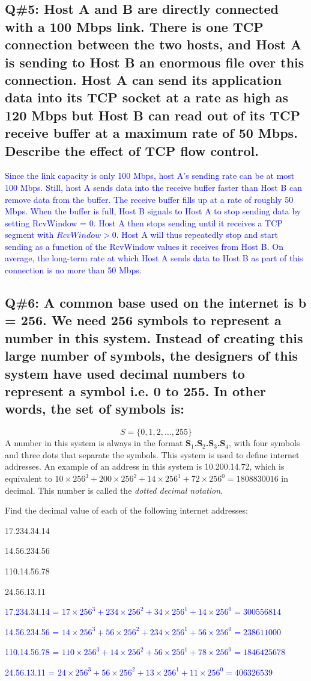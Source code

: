 \subsection*{Q\#5: Host A and B are directly connected with a 100 Mbps link. There is one TCP connection between the two hosts, and Host A is sending to Host B an enormous file over this connection. Host A can send its application data into its TCP socket at a rate as high as 120 Mbps but Host B can read out of its TCP receive buffer at a maximum rate of 50 Mbps. Describe the effect of TCP flow control.}
\textcolor{blue}{
Since the link capacity is only 100 Mbps, host A’s sending rate can be at most 100 Mbps. Still, host A sends data into the receive buffer faster than Host B can remove data from the buffer. The receive buffer fills up at a rate of roughly 50 Mbps. When the buffer is full, Host B signals to Host A to stop sending data by setting RcvWindow = 0. Host A then stops sending until it receives a TCP segment with \(RcvWindow > 0\).
Host A will thus repeatedly stop and start sending as a function of the RcvWindow values it receives from Host B. On average, the long-term rate at which Host A sends data to Host B as part of this connection is no more than 50 Mbps.
}
\subsection*{Q\#6: A common base used on the internet is b = 256. We need 256 symbols to represent a number in this system. Instead of creating this large number of symbols, the designers of this system have used decimal numbers to represent a symbol i.e. 0 to 255. In other words, the set of symbols is:}
\[ S = \{0, 1, 2, \ldots, 255\} \]
A number in this system is always in the format \textbf{S$_1$.S$_2$.S$_3$.S$_4$}, with four symbols and three dots that separate the symbols. This system is used to define internet addresses. An example of an address in this system is 10.200.14.72, which is equivalent to $10 \times 256^3 + 200 \times 256^2 + 14 \times 256^1 + 72 \times 256^0 = 1808830016$ in decimal. This number is called the \textit{dotted decimal notation}.

Find the decimal value of each of the following internet addresses:

\begin{itemize}
\item[a)] 17.234.34.14 
\item[b)] 14.56.234.56
\item[c)] 110.14.56.78
\item[d)] 24.56.13.11
\newline
\textcolor{blue}{
\item[a)] 17.234.34.14 = $17 \times 256^3 + 234 \times 256^2 + 34 \times 256^1 + 14 \times 256^0 = 300556814$
\item[b)] 14.56.234.56 = $14 \times 256^3 + 56 \times 256^2 + 234 \times 256^1 + 56 \times 256^0 = 238611000$
\item[c)] 110.14.56.78 = $110 \times 256^3 + 14 \times 256^2 + 56 \times 256^1 + 78 \times 256^0 = 1846425678$
\item[d)] 24.56.13.11 = $24 \times 256^3 + 56 \times 256^2 + 13 \times 256^1 + 11 \times 256^0 = 406326539$
}
\end{itemize}
